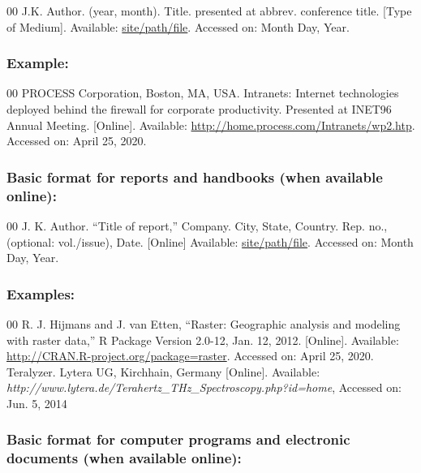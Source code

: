 \documentclass{IEEEoj-data}
\begin{document}
{\begin{thebibliography}{00}
 J.K. Author. (year, month). Title. presented at abbrev. conference title.
[Type of Medium]. Available: \underline{site/path/file}. Accessed on: Month Day, Year.
\end{thebibliography}

\subsubsection*{Example:}

\begin{thebibliography}{00}
 PROCESS Corporation, Boston, MA, USA. Intranets: Internet technologies deployed behind the firewall for corporate productivity. Presented at INET96 Annual Meeting. [Online]. Available: \underline {http://home.process.com/Intranets/wp2.htp}. Accessed on: April 25, 2020.
\end{thebibliography}

\subsubsection*{Basic format for reports and handbooks (when available online): }

\begin{thebibliography}{00}
 J. K. Author. ``Title of report,'' Company. City, State, Country. Rep. no.,
(optional: vol./issue), Date. [Online] Available:
\underline{site/path/file}. Accessed
on: Month Day, Year.
\end{thebibliography}

\subsubsection*{Examples:}

\begin{thebibliography}{00}
 R. J. Hijmans and J. van Etten, ``Raster: Geographic analysis and modeling with raster data,'' R Package Version 2.0-12, Jan. 12, 2012. [Online]. Available: \underline {http://CRAN.R-project.org/package=raster}. Accessed on: April 25, 2020.
 Teralyzer. Lytera UG, Kirchhain, Germany [Online]. Available: \emph{http://www.lytera.de/Terahertz\_THz\_Spectroscopy.php?id=home}, Accessed on: Jun. 5, 2014
\end{thebibliography}

\subsubsection*{Basic format for computer programs and electronic documents (when available online): }

}
\end{document}
